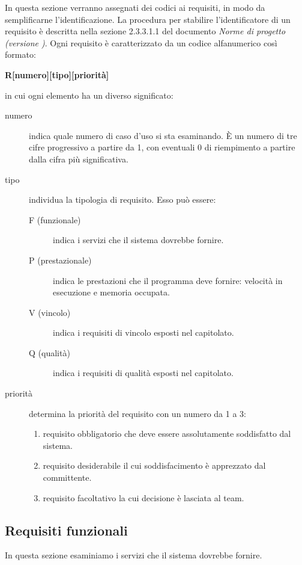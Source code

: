 \documentclass[../analisi-dei-requisiti.tex]{subfiles}
\begin{document}
In questa sezione verranno assegnati dei codici ai requisiti, in modo da semplificarne l’identificazione.
La procedura per stabilire l'identificatore di un requisito è descritta nella sezione 2.3.3.1.1 del documento \textit{Norme di progetto (versione \versione)}.
Ogni requisito è caratterizzato da un codice alfanumerico così formato:
\begin{center}
  \textbf{R[numero][tipo][priorità]}
\end{center}
in cui ogni elemento ha un diverso significato:
\begin{description}
  \item [numero] indica quale numero di caso d'uso si sta esaminando. È un numero di tre cifre progressivo a partire da 1, con eventuali 0 di riempimento a partire dalla cifra più significativa.
  \item [tipo] individua la tipologia di requisito. Esso può essere:
        \begin{description}
          \item [F (funzionale)] indica i servizi che il sistema dovrebbe fornire.
          \item [P (prestazionale)] indica le prestazioni che il programma deve fornire: velocità in esecuzione e memoria occupata.
          \item [V (vincolo)] indica i requisiti di vincolo esposti nel capitolato.
          \item [Q (qualità)] indica i requisiti di qualità esposti nel capitolato.
        \end{description}
  \item [priorità] determina la priorità del requisito con un numero da 1 a 3:
        \begin{enumerate}
          \item requisito obbligatorio che deve essere assolutamente soddisfatto dal sistema.
          \item requisito desiderabile il cui soddisfacimento è apprezzato dal committente.
          \item requisito facoltativo la cui decisione è lasciata al team.
        \end{enumerate}
\end{description}

\subsection{Requisiti funzionali}%
\label{sub:requisiti_funzionali}
In questa sezione esaminiamo i servizi che il sistema dovrebbe fornire.
\end{document}
